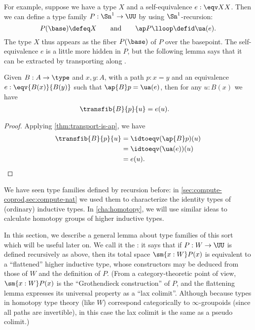 For example, suppose we have a type $X$ and a self-equivalence $e:\eqv X X$.
Then we can define a type family $P:\Sn^1 \to \UU$ by using $\Sn^1$-recursion:
\begin{equation*}
  P(\base) \defeq X
  \qquad\text{and}\qquad
  \ap P\lloop \defid \ua(e).
\end{equation*}
The type $X$ thus appears as the fiber $P(\base)$ of $P$ over the basepoint.
The self-equivalence $e$ is a little more hidden in $P$, but the following lemma says that it can be extracted by transporting along \lloop.

\begin{lem}\label{thm:transport-is-given}
  Given $B:A\to\type$ and $x,y:A$, with a path $p:x=y$ and an equivalence $e:\eqv{B(x)}{B(y)}$ such that $\ap{B}p = \ua(e)$, then for any $u:B(x)$ we have
  \begin{align*}
    \transfib{B}{p}{u} &= e(u).
  \end{align*}
\end{lem}
\begin{proof}
  Applying \cref{thm:transport-is-ap}, we have
  \begin{align*}
    \transfib{B}{p}{u} &= \idtoeqv(\ap{B}p)(u)\\
    &= \idtoeqv(\ua(e))(u)\\
    &= e(u).\qedhere
  \end{align*}
\end{proof}

We have seen type families defined by recursion before: in \cref{sec:compute-coprod,sec:compute-nat} we used them to characterize the identity types of (ordinary) inductive types.
In \cref{cha:homotopy}, we will use similar ideas to calculate homotopy groups of higher inductive types.

In this section, we describe a general lemma about type families of this sort which will be useful later on.
We call it the :
%
%
it says that if $P:W\to\UU$ is defined recursively as above, then its total space $\sm{x:W} P(x)$ is equivalent to a ``flattened'' higher inductive type, whose constructors may be deduced from those of $W$ and the definition of $P$.
(From a category-theoretic point of view, $\sm{x:W} P(x)$ is the ``Grothendieck construction'' of $P$, and the flattening lemma expresses its universal property as a ``lax colimit''.  Although because types in homotopy type theory (like $W$) correspond categorically to $\infty$-groupoids (since all paths are invertible), in this case the lax colimit is the same as a pseudo colimit.)

